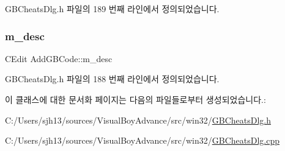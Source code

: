 G\+B\+Cheats\+Dlg.\+h 파일의 189 번째 라인에서 정의되었습니다.

\mbox{\label{class_add_g_b_code_af67488ee0354c39ce9c818e7f389e74f}} 
\subsubsection{\texorpdfstring{m\+\_\+desc}{m\_desc}}
{\footnotesize\ttfamily C\+Edit Add\+G\+B\+Code\+::m\+\_\+desc}



G\+B\+Cheats\+Dlg.\+h 파일의 188 번째 라인에서 정의되었습니다.



이 클래스에 대한 문서화 페이지는 다음의 파일들로부터 생성되었습니다.\+:\begin{DoxyCompactItemize}
\item 
C\+:/\+Users/sjh13/sources/\+Visual\+Boy\+Advance/src/win32/\mbox{\hyperlink{_g_b_cheats_dlg_8h}{G\+B\+Cheats\+Dlg.\+h}}\item 
C\+:/\+Users/sjh13/sources/\+Visual\+Boy\+Advance/src/win32/\mbox{\hyperlink{_g_b_cheats_dlg_8cpp}{G\+B\+Cheats\+Dlg.\+cpp}}\end{DoxyCompactItemize}
